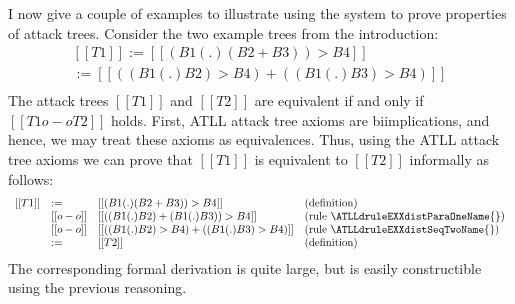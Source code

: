 I now give a couple of examples to illustrate using the system to
prove properties of attack trees.  Consider the two example trees from
the introduction:
\[
\begin{array}{lll}
  [[T1]] := [[(B1 (.) (B2 + B3)) > B4]]\\
  [[T2]] := [[((B1 (.) B2) > B4) + ((B1 (.) B3) > B4)]]\\
\end{array}
\]
The attack trees $[[T1]]$ and $[[T2]]$ are equivalent if and only if
$[[T1 o-o T2]]$ holds.  First, ATLL attack tree axioms are
biimplications, and hence, we may treat these axioms as equivalences.
Thus, using the ATLL attack tree axioms we can prove that $[[T1]]$ is
equivalent to $[[T2]]$ informally as follows:
\[
\begin{array}{lllll}
  [[T1]]
  & := & [[(B1 (.) (B2 + B3)) > B4]]                       & \text{(definition)}\\
  & [[o-o]] & [[((B1 (.) B2) + (B1 (.) B3)) > B4]]         & (\text{rule }\ATLLdruleEXXdistParaOneName{})\\
  & [[o-o]] & [[((B1 (.) B2) > B4) + ((B1 (.) B3) > B4)]]  & (\text{rule }\ATLLdruleEXXdistSeqTwoName{})\\
  & := & [[T2]]                                            & \text{(definition)}\\
\end{array}
\]
The corresponding formal derivation is quite large, but is easily
constructible using the previous reasoning.
